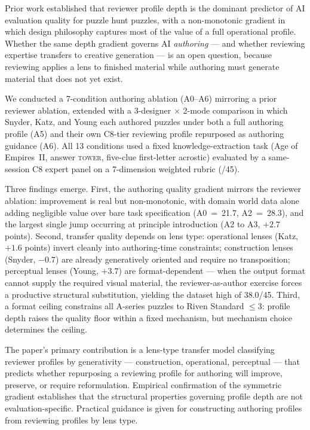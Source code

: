 Prior work established that reviewer profile depth is the dominant predictor of AI evaluation quality for puzzle hunt puzzles, with a non-monotonic gradient in which design philosophy captures most of the value of a full operational profile. Whether the same depth gradient governs AI \emph{authoring} --- and whether reviewing expertise transfers to creative generation --- is an open question, because reviewing applies a lens to finished material while authoring must generate material that does not yet exist.

We conducted a 7-condition authoring ablation (A0--A6) mirroring a prior reviewer ablation, extended with a 3-designer $\times$ 2-mode comparison in which Snyder, Katz, and Young each authored puzzles under both a full authoring profile (A5) and their own C8-tier reviewing profile repurposed as authoring guidance (A6). All 13 conditions used a fixed knowledge-extraction task (Age of Empires~II, answer \textsc{tower}, five-clue first-letter acrostic) evaluated by a same-session C8 expert panel on a 7-dimension weighted rubric (/45).

Three findings emerge. First, the authoring quality gradient mirrors the reviewer ablation: improvement is real but non-monotonic, with domain world data alone adding negligible value over bare task specification (A0~=~21.7, A2~=~28.3), and the largest single jump occurring at principle introduction (A2 to A3, $+2.7$ points). Second, transfer quality depends on lens type: operational lenses (Katz, $+1.6$ points) invert cleanly into authoring-time constraints; construction lenses (Snyder, $-0.7$) are already generatively oriented and require no transposition; perceptual lenses (Young, $+3.7$) are format-dependent --- when the output format cannot supply the required visual material, the reviewer-as-author exercise forces a productive structural substitution, yielding the dataset high of 38.0/45. Third, a format ceiling constrains all A-series puzzles to Riven Standard $\leq 3$: profile depth raises the quality floor within a fixed mechanism, but mechanism choice determines the ceiling.

The paper's primary contribution is a lens-type transfer model classifying reviewer profiles by generativity --- construction, operational, perceptual --- that predicts whether repurposing a reviewing profile for authoring will improve, preserve, or require reformulation. Empirical confirmation of the symmetric gradient establishes that the structural properties governing profile depth are not evaluation-specific. Practical guidance is given for constructing authoring profiles from reviewing profiles by lens type.
